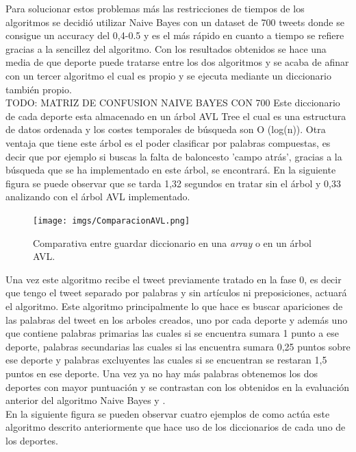 \documentclass[../all.tex]{subfiles}
\begin{document}
	Para solucionar estos problemas más las restricciones de tiempos de los algoritmos se decidió utilizar Naive Bayes con un dataset de 700 tweets donde se consigue un accuracy del 0,4-0.5 y es el más rápido en cuanto a tiempo se refiere gracias a la sencillez del algoritmo. Con los resultados obtenidos se hace una media de que deporte puede tratarse entre los dos algoritmos y se acaba de afinar con un tercer algoritmo el cual es propio y se ejecuta mediante un diccionario también propio. \\
	
	{\color{red} 
		TODO:    MATRIZ DE CONFUSION NAIVE BAYES CON 700
	}
	\newpage
	Este diccionario de cada deporte esta almacenado en un árbol AVL Tree el cual es una estructura de datos ordenada y los costes temporales de búsqueda son O (log(n)). Otra ventaja que tiene este árbol es el poder clasificar por palabras compuestas, es decir que por ejemplo si buscas la falta de baloncesto 'campo atrás', gracias a la búsqueda que se ha implementado en este árbol, se encontrará. En la siguiente figura se puede observar que se tarda 1,32 segundos en tratar sin el árbol y 0,33 analizando con el árbol AVL implementado.\\
	
	\begin{figure}[H]
		\centering
		\texttt{[image: imgs/ComparacionAVL.png]}
		\caption{Comparativa entre guardar diccionario en una \textit{array} o en un árbol AVL.}
	\end{figure}
	
	Una vez este algoritmo recibe el tweet previamente tratado en la fase 0, es decir que tengo el tweet separado por palabras y sin artículos ni preposiciones, actuará el algoritmo. Este algoritmo principalmente lo que hace es buscar apariciones de las palabras del tweet en los arboles creados, uno por cada deporte y además uno que contiene palabras primarias las cuales si se encuentra sumara 1 punto a ese deporte, palabras secundarias las cuales si las encuentra sumara 0,25 puntos sobre ese deporte y palabras excluyentes las cuales si se encuentran se restaran 1,5 puntos en ese deporte. Una vez ya no hay más palabras obtenemos los dos deportes con mayor puntuación y se contrastan con los obtenidos en la evaluación anterior del algoritmo Naive Bayes y .\\
	
	\newpage
	En la siguiente figura se pueden observar cuatro ejemplos de como actúa este algoritmo descrito anteriormente que hace uso de los diccionarios de cada uno de los deportes.
	
\end{document}
